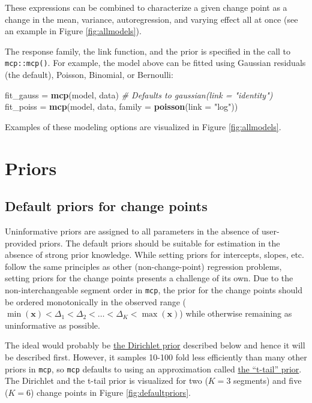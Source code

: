 \documentclass[
  american,
]{article}
\newenvironment{Shaded}{\begin{snugshade}}{\end{snugshade}}
\newcommand{\CommentTok}[1]{\textcolor[rgb]{0.56,0.35,0.01}{\textit{#1}}}
\newcommand{\DataTypeTok}[1]{\textcolor[rgb]{0.13,0.29,0.53}{#1}}
\newcommand{\KeywordTok}[1]{\textcolor[rgb]{0.13,0.29,0.53}{\textbf{#1}}}
\newcommand{\NormalTok}[1]{#1}
\newcommand{\StringTok}[1]{\textcolor[rgb]{0.31,0.60,0.02}{#1}}
\begin{document}
These expressions can be combined to characterize a given change point as a change in the mean, variance, autoregression, and varying effect all at once (see an example in Figure \ref{fig:allmodels}).

The response family, the link function, and the prior is specified in the call to \texttt{mcp::mcp()}. For example, the model above can be fitted using Gaussian residuals (the default), Poisson, Binomial, or Bernoulli:

\begin{Shaded}
\begin{Highlighting}[]
\NormalTok{fit_gauss =}\StringTok{ }\KeywordTok{mcp}\NormalTok{(model, data)  }\CommentTok{# Defaults to gaussian(link = "identity")}
\NormalTok{fit_poiss =}\StringTok{ }\KeywordTok{mcp}\NormalTok{(model, data, }\DataTypeTok{family =} \KeywordTok{poisson}\NormalTok{(}\DataTypeTok{link =} \StringTok{"log"}\NormalTok{))}
\end{Highlighting}
\end{Shaded}

Examples of these modeling options are visualized in Figure \ref{fig:allmodels}.

\hypertarget{priors}{%
\section{Priors}\label{priors}}

\hypertarget{default-priors-for-change-points}{%
\subsection{Default priors for change points}\label{default-priors-for-change-points}}

Uninformative priors are assigned to all parameters in the absence of user-provided priors. The default priors should be suitable for estimation in the absence of strong prior knowledge. While setting priors for intercepts, slopes, etc. follow the same principles as other (non-change-point) regression problems, setting priors for the change points presents a challenge of its own. Due to the non-interchangeable segment order in \texttt{mcp}, the prior for the change points should be ordered monotonically in the observed range (\(\min(\mathbf{x}) < \Delta_1 < \Delta_2 < \ldots < \Delta_K < \max(\mathbf{x})\)) while otherwise remaining as uninformative as possible.

The ideal would probably be \protect\hyperlink{dirichlet}{the Dirichlet prior} described below and hence it will be described first. However, it samples 10-100 fold less efficiently than many other priors in \texttt{mcp}, so \texttt{mcp} defaults to using an approximation called \protect\hyperlink{t-tail}{the ``t-tail'' prior}. The Dirichlet and the t-tail prior is visualized for two (\(K = 3\) segments) and five (\(K = 6\)) change points in Figure \ref{fig:defaultpriors}.
\end{document}
